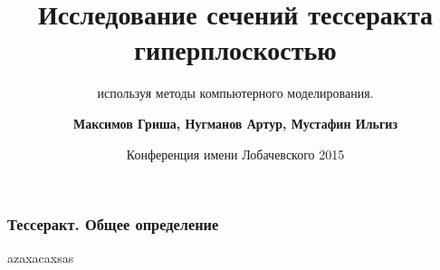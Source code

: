 \documentclass[10pt,pdf,hyperref={unicode}]{beamer}
\title[Исследование сечений тессеракта трехмерной гиперплоскостью с использованием методов компьютерного моделирования] %
{ \bfseries Исследование сечений тессеракта гиперплоскостью}
\subtitle{используя методы компьютерного моделирования.}
\author[М.Гриша, Н.Артур, М.Ильгиз]
{ \bfseries Максимов Гриша, Нугманов Артур, Мустафин Ильгиз}
\institute[ТТЛ №2] %
{
  { \normalsize Татаро - Турецкий Лицей №2} \\
  Московского района города Казани
}
\date[2015-03-26] %
{Конференция имени Лобачевского 2015}
\begin{document}
\frame{\titlepage}

\begin{frame}[fragile]
\frametitle{Тессеракт. Общее определение}

\end{frame}
\begin{frame}
azaxacaxsas
\end{frame}
\end{document}
